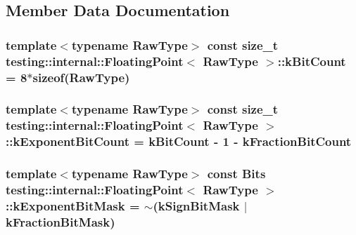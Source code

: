 \subsection{Member Data Documentation}
\hypertarget{classtesting_1_1internal_1_1FloatingPoint_ab819d2e8f93e9e482373999f0f8d71b9}{
\subsubsection[{k\-Bit\-Count}]{\setlength{\rightskip}{0pt plus 5cm}template$<$typename Raw\-Type$>$ const size\-\_\-t {\bf testing\-::internal\-::\-Floating\-Point}$<$ Raw\-Type $>$\-::k\-Bit\-Count = 8$\ast$sizeof(Raw\-Type)\hspace{0.3cm}{\ttfamily [static]}}}\label{classtesting_1_1internal_1_1FloatingPoint_ab819d2e8f93e9e482373999f0f8d71b9}
\hypertarget{classtesting_1_1internal_1_1FloatingPoint_a1973d843c00781053d3073daa8a40119}{
\subsubsection[{k\-Exponent\-Bit\-Count}]{\setlength{\rightskip}{0pt plus 5cm}template$<$typename Raw\-Type$>$ const size\-\_\-t {\bf testing\-::internal\-::\-Floating\-Point}$<$ Raw\-Type $>$\-::k\-Exponent\-Bit\-Count = {\bf k\-Bit\-Count} -\/ 1 -\/ {\bf k\-Fraction\-Bit\-Count}\hspace{0.3cm}{\ttfamily [static]}}}\label{classtesting_1_1internal_1_1FloatingPoint_a1973d843c00781053d3073daa8a40119}
\hypertarget{classtesting_1_1internal_1_1FloatingPoint_a66065dfc4d5f41100f686159637af23b}{
\subsubsection[{k\-Exponent\-Bit\-Mask}]{\setlength{\rightskip}{0pt plus 5cm}template$<$typename Raw\-Type$>$ const {\bf Bits} {\bf testing\-::internal\-::\-Floating\-Point}$<$ Raw\-Type $>$\-::k\-Exponent\-Bit\-Mask = $\sim$({\bf k\-Sign\-Bit\-Mask} $\vert$ {\bf k\-Fraction\-Bit\-Mask})\hspace{0.3cm}{\ttfamily [static]}}}\label{classtesting_1_1internal_1_1FloatingPoint_a66065dfc4d5f41100f686159637af23b}
